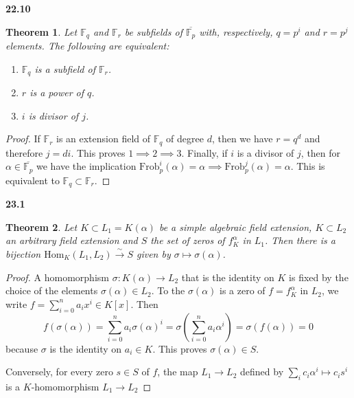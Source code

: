 \documentclass{article}
\theoremstyle{plain}
\newcommand{\F}{\mathbb{F}}
\newtheorem*{theorem*}{Theorem}
\theoremstyle{remark}
\newenvironment{colbox}[1]
    {\newcommand\colboxcolor{B6D0DE}%
    \begin{lrbox}{\selvestebox}%
    \begin{minipage}{\dimexpr\columnwidth-2\fboxsep\relax}\textbf{#1}}
    {\vspace{0.5em}\end{minipage}\end{lrbox}%
    \begin{center}
    \colorbox[HTML]{\colboxcolor}{\usebox{\selvestebox}}
    \end{center}}
\begin{document}
    \begin{colbox}{22.10}
        \begin{theorem*}
            Let $\F_q$ and $\F_r$ be subfields of $\overline{\F_p}$ with, respectively, $q=p^i$ and $r=p^j$ elements.
            The following are equivalent:
            \begin{enumerate}
                \item $\F_q$ is a subfield of $\F_r$.
                \item $r$ is a power of $q$.
                \item $i$ is divisor of $j$.
            \end{enumerate}
        \end{theorem*}
    \end{colbox}
    \begin{proof}
        If $\F_r$ is an extension field of $\F_q$ of degree $d$, then we have $r=q^d$ and therefore $j=di$.
        This proves $1\implies 2\implies 3$. Finally, if $i$ is a divisor of $j$, then for $\alpha\in\overline{\F_p}$ we have the implication $\text{Frob}_p^i(\alpha)=\alpha\implies\text{Frob}_p^j(\alpha)=\alpha$.
        This is equivalent to $\F_q\subset\F_r$.
    \end{proof}

    \begin{colbox}{23.1}
        \begin{theorem*}
            Let $K\subset L_1=K(\alpha)$ be a simple algebraic field extension, $K\subset L_2$ an arbitrary field extension and $S$ the set of zeros of $f_K^\alpha$ in $L_1$.
            Then there is a bijection $\text{Hom}_K(L_1,L_2)\xrightarrow{\sim}S$ given by $\sigma\mapsto\sigma(\alpha)$.
        \end{theorem*}
    \end{colbox}
    \begin{proof}
        A homomorphism $\sigma:K(\alpha)\to L_2$ that is the identity on $K$ is fixed by the choice of the elements $\sigma(\alpha)\in L_2$.
        To the $\sigma(\alpha)$ is a zero of $f=f_K^\alpha$ in $L_2$, we write $f=\sum_{i=0}^n a_ix^i\in K[x]$.
        Then 
        $$f(\sigma(\alpha))=\sum_{i=0}^n a_i\sigma(\alpha)^i=\sigma\left(\sum_{i=0}^n a_i\alpha^i\right)=\sigma(f(\alpha))=0$$
        because $\sigma$ is the identity on $a_i\in K$. This proves $\sigma(\alpha)\in S$. 

        Conversely, for every zero $s\in S$ of $f$, the map $L_1\to L_2$ defined by $\sum_{i}c_i\alpha^i\mapsto c_is^i$ is a $K$-homomorphism $L_1\to L_2$
    \end{proof}
\end{document}
